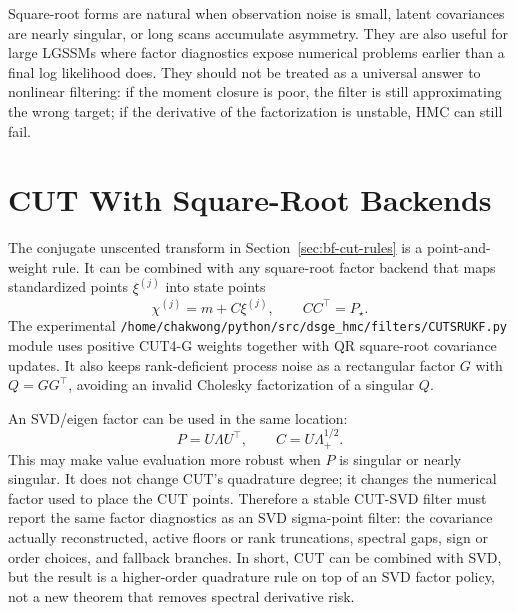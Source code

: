 Square-root forms are natural when observation noise is small, latent
covariances are nearly singular, or long scans accumulate asymmetry.  They are
also useful for large LGSSMs where factor diagnostics expose numerical problems
earlier than a final log likelihood does.  They should not be treated as a
universal answer to nonlinear filtering: if the moment closure is poor, the
filter is still approximating the wrong target; if the derivative of the
factorization is unstable, HMC can still fail.

\section{CUT With Square-Root Backends}
\label{sec:bf-cut-square-root}

The conjugate unscented transform in Section~\ref{sec:bf-cut-rules} is a
point-and-weight rule.  It can be combined with any square-root factor backend
that maps standardized points $\xi^{(j)}$ into state points
\[
  \chi^{(j)}=m+C\xi^{(j)},\qquad CC^\top=P_\star .
\]
The experimental
\texttt{/home/chakwong/python/src/dsge\_hmc/filters/CUTSRUKF.py} module uses
positive CUT4-G weights together with QR square-root covariance updates.  It also
keeps rank-deficient process noise as a rectangular factor $G$ with
$Q=GG^\top$, avoiding an invalid Cholesky factorization of a singular $Q$.

An SVD/eigen factor can be used in the same location:
\[
  P=U\Lambda U^\top,\qquad C=U\Lambda_+^{1/2}.
\]
This may make value evaluation more robust when $P$ is singular or nearly
singular.  It does not change CUT's quadrature degree; it changes the numerical
factor used to place the CUT points.  Therefore a stable CUT-SVD filter must
report the same factor diagnostics as an SVD sigma-point filter: the covariance
actually reconstructed, active floors or rank truncations, spectral gaps, sign
or order choices, and fallback branches.  In short, CUT can be combined with
SVD, but the result is a higher-order quadrature rule on top of an SVD factor
policy, not a new theorem that removes spectral derivative risk.

